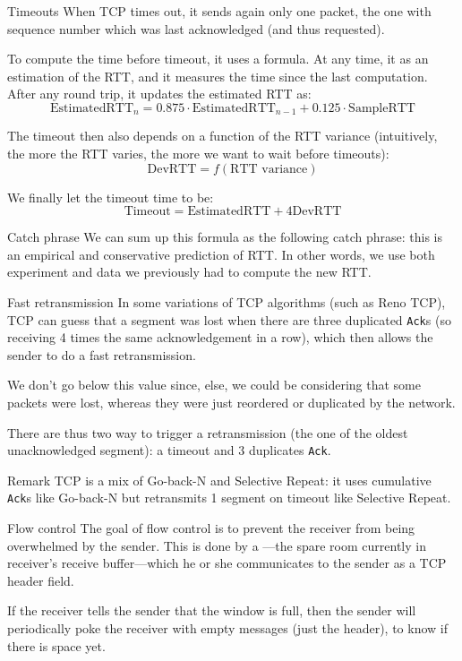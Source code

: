 \documentclass[a4paper]{article}
\begin{document}
\begin{parag}{Timeouts}
    When TCP times out, it sends again only one packet, the one with sequence number which was last acknowledged (and thus requested). 

    To compute the time before timeout, it uses a formula. At any time, it as an estimation of the RTT, and it measures the time since the last computation. After any round trip, it updates the estimated RTT as:
    \[\text{EstimatedRTT}_{n} = 0.875\cdot \text{EstimatedRTT}_{n-1} + 0.125\cdot \text{SampleRTT}\]

    The timeout then also depends on a function of the RTT variance (intuitively, the more the RTT varies, the more we want to wait before timeouts): 
    \[\text{DevRTT} = f\left(\text{RTT variance}\right)\]
    
    We finally let the timeout time to be: 
    \[\text{Timeout} = \text{EstimatedRTT} + 4\text{DevRTT}\]
    
    \begin{subparag}{Catch phrase}
        We can sum up this formula as the following catch phrase: this is an empirical and conservative prediction of RTT. In other words, we use both experiment and data we previously had to compute the new RTT.
    \end{subparag}

    \begin{subparag}{Fast retransmission}
        In some variations of TCP algorithms (such as Reno TCP), TCP can guess that a segment was lost when there are three duplicated \texttt{Ack}s (so receiving 4 times the same acknowledgement in a row), which then allows the sender to do a fast retransmission.

        We don't go below this value since, else, we could be considering that some packets were lost, whereas they were just reordered or duplicated by the network.

        There are thus two way to trigger a retransmission (the one of the oldest unacknowledged segment): a timeout and 3 duplicates \texttt{Ack}.
    \end{subparag}
\end{parag}

\begin{parag}{Remark}
    TCP is a mix of Go-back-N and Selective Repeat: it uses cumulative \texttt{Ack}s like Go-back-N but retransmits 1 segment on timeout like Selective Repeat.
\end{parag}

\begin{parag}{Flow control}
    The goal of flow control is to prevent the receiver from being overwhelmed by the sender. This is done by a ---the spare room currently in receiver's receive buffer---which he or she communicates to the sender as a TCP header field.

    If the receiver tells the sender that the window is full, then the sender will periodically poke the receiver with empty messages (just the header), to know if there is space yet.

\end{parag}
\end{document}
